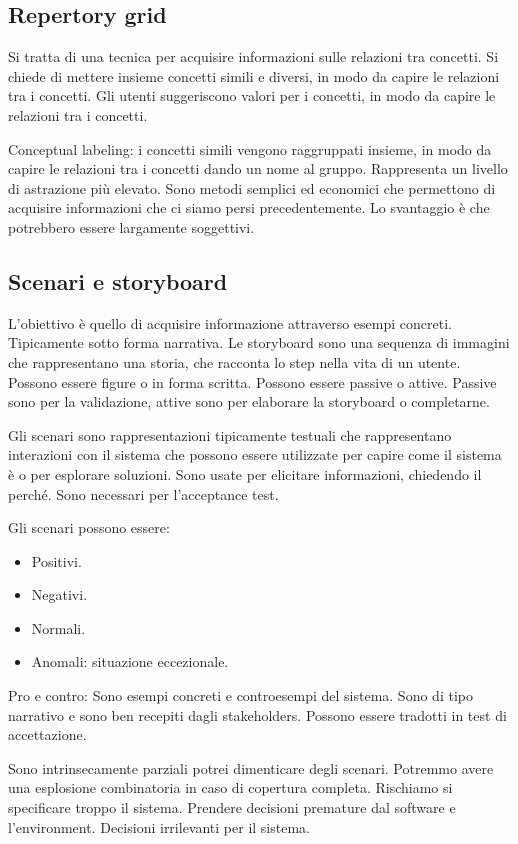 \documentclass[oneside,a4paper,11pt]{book}
\theoremstyle{italicstyle}
\theoremstyle{normStyle}
\begin{document}
\subsection{Repertory grid}
Si tratta di una tecnica per acquisire informazioni sulle relazioni tra
concetti. Si chiede di mettere insieme concetti simili e diversi, in modo
da capire le relazioni tra i concetti. 
Gli utenti suggeriscono valori per i concetti, in modo da capire le relazioni
tra i concetti.

Conceptual labeling: i concetti simili vengono raggruppati insieme, in modo
da capire le relazioni tra i concetti dando un nome al gruppo. Rappresenta un 
livello di astrazione più elevato.
Sono metodi semplici ed economici che permettono di acquisire informazioni
che ci siamo persi precedentemente. Lo svantaggio è che potrebbero essere 
largamente soggettivi.

\subsection{Scenari e storyboard}
L'obiettivo è quello di acquisire informazione attraverso esempi concreti.
Tipicamente sotto forma narrativa.
Le storyboard sono una sequenza di immagini che rappresentano una storia, 
che racconta lo step nella vita di un utente. Possono essere figure o 
in forma scritta. Possono essere passive o attive. Passive sono per 
la validazione, attive sono per elaborare la storyboard o completarne.

Gli scenari sono rappresentazioni tipicamente testuali che rappresentano 
interazioni con il sistema che possono essere utilizzate per capire 
come il sistema è o per esplorare soluzioni. Sono usate per elicitare 
informazioni, chiedendo il perché. Sono necessari per l'acceptance test.

Gli scenari possono essere:
\begin{itemize}
  \item Positivi.
  \item Negativi.
  \item Normali.
  \item Anomali: situazione eccezionale.
\end{itemize}
Pro e contro:
Sono esempi concreti e controesempi del sistema. Sono di tipo narrativo e 
sono ben recepiti dagli stakeholders. Possono essere tradotti in test di
accettazione. 

Sono intrinsecamente parziali potrei dimenticare degli scenari. Potremmo avere 
una esplosione combinatoria in caso di copertura completa. Rischiamo 
si specificare troppo il sistema. Prendere decisioni premature dal software 
e l'environment.
Decisioni irrilevanti per il sistema.
\end{document}
